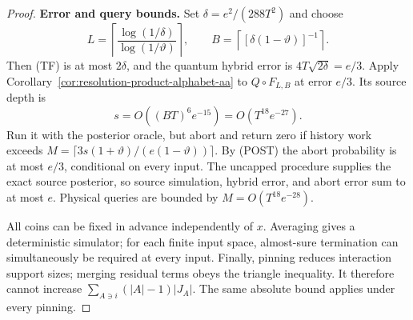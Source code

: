 \documentclass[11pt]{article}
\theoremstyle{definition}
\theoremstyle{remark}
\begin{document}
\begin{proof}
\textbf{Error and query bounds.}
Set \(\delta=e^2/(288T^2)\) and choose
\[
 L=\left\lceil\frac{\log(1/\delta)}{\log(1/\vartheta)}\right\rceil,
 \qquad B=\left\lceil[\delta(1-\vartheta)]^{-1}\right\rceil.
\]
Then (TF) is at most \(2\delta\), and the quantum hybrid error is
\(4T\sqrt{2\delta}=e/3\). Apply
Corollary~\ref{cor:resolution-product-alphabet-aa} to
\(Q\circ F_{L,B}\) at error \(e/3\). Its source depth is
\[
 s=O((BT)^6e^{-15})=O(T^{18}e^{-27}).
\]
Run it with the posterior oracle, but abort and return zero if history
work exceeds
\(M=\lceil3s(1+\vartheta)/(e(1-\vartheta))\rceil\).
By (POST) the abort probability is at most \(e/3\), conditional on
every input. The uncapped procedure supplies the exact source
posterior, so source simulation, hybrid error, and abort error sum to
at most \(e\). Physical queries are bounded by
\(M=O(T^{18}e^{-28})\).

All coins can be fixed in advance independently of \(x\). Averaging
gives a deterministic simulator; for each finite input space,
almost-sure termination can simultaneously be required at every input.
Finally, pinning reduces interaction support sizes; merging residual
terms obeys the triangle inequality. It therefore cannot increase
\(\sum_{A\ni i}(|A|-1)|J_A|\). The same absolute bound applies
under every pinning.
\end{proof}
\end{document}
